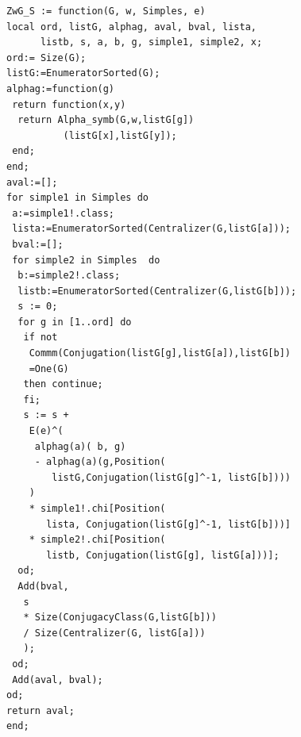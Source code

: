 \documentclass[a4paper, 10pt]{book}
\theoremstyle{definition}
\numberwithin{equation}{chapter}
\begin{document}
\begin{lstlisting}
ZwG_S := function(G, w, Simples, e)
local ord, listG, alphag, aval, bval, lista, 
      listb, s, a, b, g, simple1, simple2, x;
ord:= Size(G);
listG:=EnumeratorSorted(G);
alphag:=function(g)
 return function(x,y)
  return Alpha_symb(G,w,listG[g]) 
          (listG[x],listG[y]);
 end;
end;
aval:=[];
for simple1 in Simples do
 a:=simple1!.class;
 lista:=EnumeratorSorted(Centralizer(G,listG[a]));
 bval:=[];
 for simple2 in Simples  do
  b:=simple2!.class;
  listb:=EnumeratorSorted(Centralizer(G,listG[b]));
  s := 0;
  for g in [1..ord] do
   if not 
    Commm(Conjugation(listG[g],listG[a]),listG[b])
    =One(G) 
   then continue;
   fi;
   s := s + 
    E(e)^(
     alphag(a)( b, g) 
     - alphag(a)(g,Position(
        listG,Conjugation(listG[g]^-1, listG[b])))
    ) 
    * simple1!.chi[Position(
       lista, Conjugation(listG[g]^-1, listG[b]))]
    * simple2!.chi[Position(
       listb, Conjugation(listG[g], listG[a]))];
  od;
  Add(bval, 
   s 
   * Size(ConjugacyClass(G,listG[b]))
   / Size(Centralizer(G, listG[a]))
   );  
 od;
 Add(aval, bval);
od;
return aval;
end;

\end{lstlisting}
\end{document}
